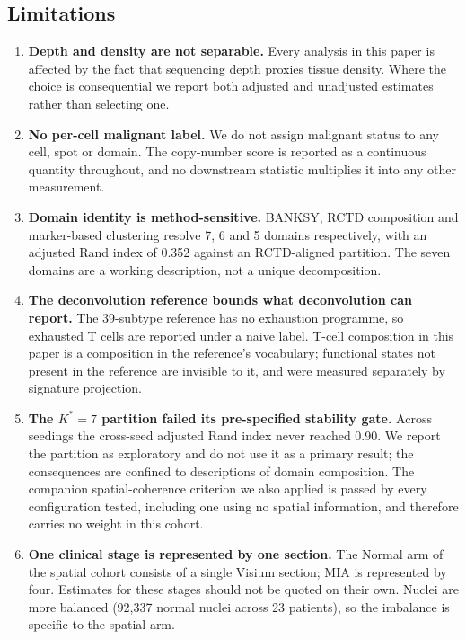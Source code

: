 \subsection{Limitations}

\begin{enumerate}\itemsep2pt

\item \textbf{Depth and density are not separable.} Every analysis in this paper is
affected by the fact that sequencing depth proxies tissue density. Where the choice is
consequential we report both adjusted and unadjusted estimates rather than selecting one.

\item \textbf{No per-cell malignant label.} We do not assign malignant status to any cell,
spot or domain. The copy-number score is reported as a continuous quantity throughout, and
no downstream statistic multiplies it into any other measurement.

\item \textbf{Domain identity is method-sensitive.} BANKSY, RCTD composition and
marker-based clustering resolve 7, 6 and 5 domains respectively, with an adjusted Rand
index of 0.352 against an RCTD-aligned partition. The seven domains are a working
description, not a unique decomposition.

\item \textbf{The deconvolution reference bounds what deconvolution can report.} The
39-subtype reference has no exhaustion programme, so exhausted T cells are reported under a
naive label. T-cell composition in this paper is a composition in the reference's
vocabulary; functional states not present in the reference are invisible to it, and were
measured separately by signature projection.

\item \textbf{The $K^{*}=7$ partition failed its pre-specified stability gate.} Across
seedings the cross-seed adjusted Rand index never reached 0.90. We report the partition as
exploratory and do not use it as a primary result; the consequences are confined to
descriptions of domain composition. The companion spatial-coherence criterion we also
applied is passed by every configuration tested, including one using no spatial
information, and therefore carries no weight in this cohort.

\item \textbf{One clinical stage is represented by one section.} The Normal arm of the
spatial cohort consists of a single Visium section; MIA is represented by four. Estimates
for these stages should not be quoted on their own. Nuclei are more balanced (92,337
normal nuclei across 23 patients), so the imbalance is specific to the spatial arm.


\end{enumerate}

